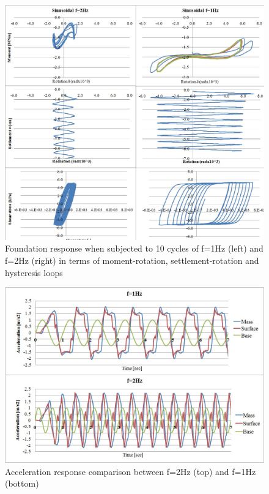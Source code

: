  \begin{figure}[!h]
 	\centering
 	\includegraphics[width=0.8\linewidth]{"2hz"}
 	\caption{Foundation response when subjected to 10 cycles of f=1Hz (left) and f=2Hz (right) in terms of moment-rotation, settlement-rotation and hysteresis loops}
 	\label{2hz}
 \end{figure}
 
 \begin{figure}[!h]
 	\centering
 	\includegraphics[width=0.6\linewidth]{"acc-2hz"}
 	\caption{Acceleration response comparison between f=2Hz (top) and f=1Hz (bottom)}
 	\label{acc2hz}
 \end{figure}


